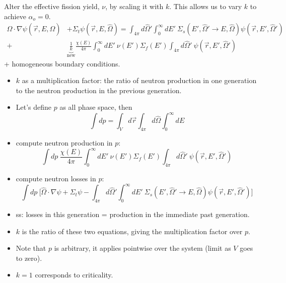 \documentclass[12pt]{article}
\newcommand{\rvec}{\ensuremath{\vec{r}}}
\newcommand{\vOmega}{\ensuremath{\hat{\Omega}}}
\begin{document}
Alter the effective fission yield, $\nu$, by scaling it with $k$. 
This allows us to vary $k$ to achieve $\alpha_o = 0$.
%
\begin{align*}
\vOmega \cdot \nabla \psi(\vec{r}, E, \vOmega) &+ \Sigma_t \psi(\vec{r}, E, \vOmega) = \int_{4 \pi} d\vOmega' \int_0^{\infty} dE' \: \Sigma_s(E', \vOmega' \rightarrow E, \vOmega) \psi(\vec{r}, E', \vOmega')\\
 +& \underbrace{\frac{1}{k}}_{\text{new}}\frac{\chi(E)}{4 \pi}\int_0^{\infty} dE' \: \nu(E') \Sigma_f(E') \int_{4 \pi} d\vOmega' \:\psi(\vec{r}, E', \vOmega')
\end{align*}
%
+ homogeneous boundary conditions.
\begin{itemize}
\item $k$ as a multiplication factor: the ratio of neutron production in one generation to the neutron production in the previous generation.
\item Let's define $p$ as all phase space, then
  \[\int dp = \int_{V} d\rvec \int_{4 \pi} d\vOmega \int_0^{\infty} dE\]
\item compute neutron production in $p$:
  \[\int dp\:\frac{\chi(E)}{4 \pi}\int_0^{\infty} dE' \: \nu(E') \Sigma_f(E') \int_{4 \pi} d\vOmega' \:\psi(\vec{r}, E', \vOmega') \]
\item compute neutron losses in $p$:
  \[\int dp\:\biggl[\vOmega \cdot \nabla \psi + \Sigma_t \psi - \int_{4 \pi} d\vOmega' \int_0^{\infty} dE' \: \Sigma_s(E', \vOmega' \rightarrow E, \vOmega) \psi(\vec{r}, E', \vOmega') \biggr] \]
\item ss: losses in this generation = production in the immediate past generation.
\item $k$ is the ratio of these two equations, giving the multiplication factor over $p$.
\item Note that $p$ is arbitrary, it applies pointwise over the system (limit as $V$ goes to zero).
\item $k=1$ corresponds to criticality.
\end{itemize}
\end{document}
